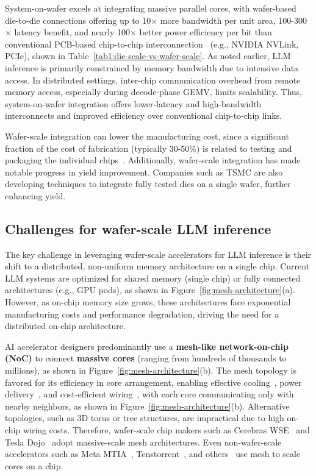  System-on-wafer excels at integrating massive parallel cores, with wafer-based die-to-die connections offering up to 10$\times$ more bandwidth per unit area, 100-300$\times$ latency benefit, and nearly 100$\times$ better power efficiency per bit than conventional PCB-based chip-to-chip interconnection~\cite{wse} (e.g., NVIDIA NVLink, PCIe), shown in Table~\ref{tab1:die-scale-vs-wafer-scale}. As noted earlier, LLM inference is primarily constrained by memory bandwidth due to intensive data access. In distributed settings, inter-chip communication overhead from remote memory access, especially during decode-phase GEMV, limits scalability. Thus, system-on-wafer integration offers lower-latency and high-bandwidth interconnects and improved efficiency over conventional chip-to-chip links.

 Wafer-scale integration can lower the manufacturing cost, since a significant fraction of the cost of fabrication (typically 30-50\%) is related to testing and packaging the individual chips~\cite{wiki:waferscale}. Additionally, wafer-scale integration has made notable progress in yield improvement. Companies such as TSMC are also developing techniques to integrate fully tested dies on a single wafer, further enhancing yield.

\vspace{-3mm}
\subsection{Challenges for wafer-scale LLM inference}
\vspace{-1mm}

The key challenge in leveraging wafer-scale accelerators for LLM inference is their shift to a distributed, non-uniform memory architecture on a single chip. Current LLM systems are optimized for shared memory (single chip) or fully connected architectures (e.g., GPU pods), as shown in Figure~\ref{fig:mesh-architecture}(a). However, as on-chip memory size grows, these architectures face exponential manufacturing costs and performance degradation, driving the need for a distributed on-chip architecture.

AI accelerator designers predominantly use a \textbf{mesh-like network-on-chip (NoC)} to connect \textbf{massive cores} (ranging from hundreds of thousands to millions), as shown in Figure~\ref{fig:mesh-architecture}(b). The mesh topology is favored for its efficiency in core arrangement, enabling effective cooling~\cite{cooling}, power delivery~\cite{powerdelivery}, and cost-efficient wiring~\cite{chip-cost-1, chip-cost-2}, with each core communicating only with nearby neighbors, as shown in Figure~\ref{fig:mesh-architecture}(b). Alternative topologies, such as 3D torus or tree structures, are impractical due to high on-chip wiring costs. Therefore, wafer-scale chip makers such as Cerebras WSE~\cite{wse} and Tesla Dojo~\cite{dojo} adopt massive-scale mesh architectures. Even non-wafer-scale accelerators such as Meta MTIA~\cite{mtia}, Tenstorrent~\cite{tenstorrent}, and others~\cite{amd-xdna, azure-maia} use mesh to scale cores on a chip.

